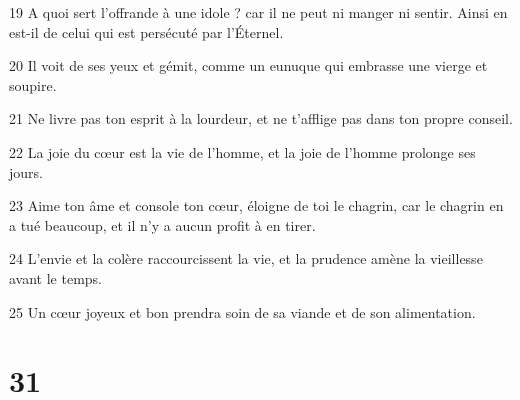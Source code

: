 \par 19 A quoi sert l'offrande à une idole ? car il ne peut ni manger ni sentir. Ainsi en est-il de celui qui est persécuté par l'Éternel.
\par 20 Il voit de ses yeux et gémit, comme un eunuque qui embrasse une vierge et soupire.
\par 21 Ne livre pas ton esprit à la lourdeur, et ne t'afflige pas dans ton propre conseil.
\par 22 La joie du cœur est la vie de l'homme, et la joie de l'homme prolonge ses jours.
\par 23 Aime ton âme et console ton cœur, éloigne de toi le chagrin, car le chagrin en a tué beaucoup, et il n'y a aucun profit à en tirer.
\par 24 L'envie et la colère raccourcissent la vie, et la prudence amène la vieillesse avant le temps.
\par 25 Un cœur joyeux et bon prendra soin de sa viande et de son alimentation.

\chapter{31}

